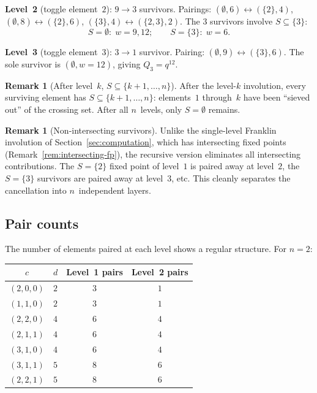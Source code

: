 \documentclass[11pt]{article}
\theoremstyle{plain}
\theoremstyle{definition}
\newtheorem{remark}[theorem]{Remark}
\begin{document}
\noindent\textbf{Level~2} (toggle element~$2$):
$9 \to 3$ survivors.  Pairings:
$(\emptyset, 6) \leftrightarrow (\{2\}, 4)$,
$(\emptyset, 8) \leftrightarrow (\{2\}, 6)$,
$(\{3\}, 4) \leftrightarrow (\{2,3\}, 2)$.
The $3$ survivors involve $S \subseteq \{3\}$:
\[
  S = \emptyset:\; w = 9, 12; \qquad
  S = \{3\}:\; w = 6.
\]

\noindent\textbf{Level~3} (toggle element~$3$):
$3 \to 1$ survivor.  Pairing:
$(\emptyset, 9) \leftrightarrow (\{3\}, 6)$.
The sole survivor is $(\emptyset, w{=}12)$, giving
$Q_3 = q^{12}$.

\begin{remark}[After level~$k$, $S \subseteq \{k{+}1, \ldots, n\}$]
\label{rem:after-level-k}
After the level-$k$ involution, every surviving element
has $S \subseteq \{k{+}1, \ldots, n\}$: elements~$1$
through~$k$ have been ``sieved out'' of the crossing set.
After all $n$~levels, only $S = \emptyset$ remains.
\end{remark}

\begin{remark}[Non-intersecting survivors]
\label{rem:survivors}
Unlike the single-level Franklin involution of
Section~\ref{sec:computation}, which has intersecting
fixed points (Remark~\ref{rem:intersecting-fp}), the
recursive version eliminates all intersecting contributions.
The $S = \{2\}$ fixed point of level~$1$ is paired away at
level~$2$, the $S = \{3\}$ survivors are paired away at
level~$3$, etc.  This cleanly separates the cancellation
into $n$~independent layers.
\end{remark}


\subsection{Pair counts}

The number of elements paired at each level shows a
regular structure.  For $n = 2$:

\medskip
\begin{center}
\begin{tabular}{c|c|c|c}
$c$ & $d$ &
  \textbf{Level~1 pairs} &
  \textbf{Level~2 pairs} \\ \hline
$(2,0,0)$ & $2$ & $3$ & $1$ \\
$(1,1,0)$ & $2$ & $3$ & $1$ \\
$(2,2,0)$ & $4$ & $6$ & $4$ \\
$(2,1,1)$ & $4$ & $6$ & $4$ \\
$(3,1,0)$ & $4$ & $6$ & $4$ \\
$(3,1,1)$ & $5$ & $8$ & $6$ \\
$(2,2,1)$ & $5$ & $8$ & $6$ \\
\end{tabular}
\end{center}
\end{document}
